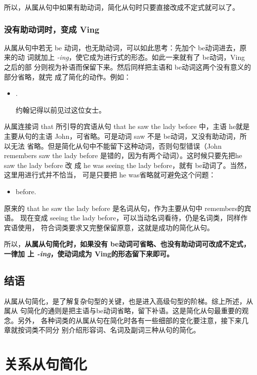 所以，从属从句中如果有助动词，简化从句时只要直接改成不定式就可以了。

\subsection{没有助动词时，变成 Ving}
\label{subsec:toing}

从属从句中若无 be 动词，也无助动词，可以如此思考：先加个 be动词进去，原来的动
词就加上 \emph{-ing}，使它成为进行式的形态。如此一来就有了 be动词，Ving 之后的部
分则视为补语而保留下来。然后同样把主语和 be动词这两个没有意义的部分省略，就完
成了简化的动作。例如：
\begin{itemize}
\item {}   .

  约翰记得以前见过这位女士。
\end{itemize}

从属连接词 that 所引导的宾语从句 that he saw the lady before 中，主语 he就是
主要从句的主语 John，可省略。可是动词 saw 不是 be动词，又没有助动词，所以无法
省略。但是简化从句中不能留下这种动词，否则句型错误（John remembers saw the
lady before 是错的，因为有两个动词）。这时候只要先把he saw the lady before 改
成 he was seeing the lady before，就有 be动词了。当然，这里用进行式并不恰当，
可是只要把 he was省略就可避免这个问题：
\begin{itemize}
\item {}   before.
\end{itemize}
原来的 that he saw the lady before 是名词从句，作为主要从句中 remembers的宾语。
现在变成 seeing the lady before，可以当动名词看待，仍是名词类，同样作宾语使用，
符合词类要求又完整保留原意，这就是成功的简化从句。

所以，\textbf{从属从句简化时，如果没有 be动词可省略、也没有助动词可改成不定式，一律加
上 \emph{-ing}，使动词成为 Ving的形态留下来即可。}

\section{结语}

从属从句简化，是了解复杂句型的关键，也是进入高级句型的阶梯。综上所述，从属从
句简化的通则是把主语与be动词省略，留下补语。这是简化从句最重要的观念。另外，
各种词类的从属从句在简化时各有一些细部的变化要注意，接下来几章就按词类不同分
别介绍形容词、名词及副词三种从句的简化。

\chapter{关系从句简化}

